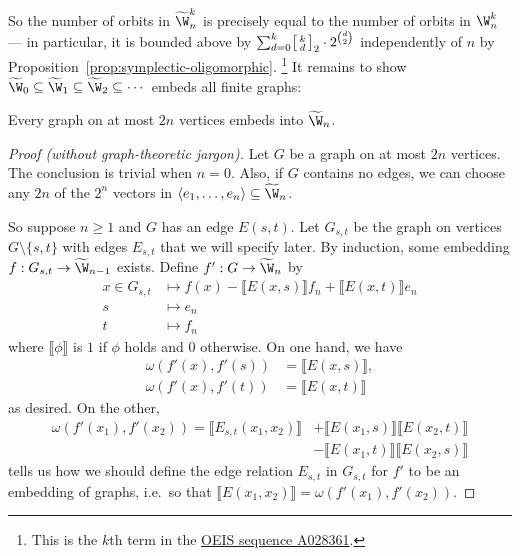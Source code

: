 So the number of orbits in $\widetilde \W_n^k$ is precisely equal to the number of orbits in $\W_n^k$
--- in particular, it is bounded above by $\sum_{d=0}^k \begin{bsmallmatrix}k \\ d\end{bsmallmatrix}_2 \cdot 2^{\binom{d}{2}}$ independently of $n$ by Proposition~\ref{prop:symplectic-oligomorphic}.%
\footnote{This is the $k$th term in the \href{https://oeis.org/A028361}{OEIS sequence A028361}.}
It remains to show $\widetilde \W_0 \subseteq \widetilde \W_1 \subseteq \widetilde \W_2 \subseteq \cdots$ embeds all finite graphs:

\begin{proposition}[{\cite[Thm.~8.11.2]{GR01}}]
    Every graph on at most $2n$ vertices embeds into $\widetilde \W_n$.
\end{proposition}
\begin{proof}[Proof (without graph-theoretic jargon)]

    Let $G$ be a graph on at most $2n$ vertices. 
    The conclusion is trivial when $n = 0$.
    Also, if $G$ contains no edges, we can choose any $2n$ of the $2^n$ vectors in 
    $\langle e_1, \ldots, e_n \rangle \subseteq \widetilde \W_n$.
    
    So suppose $n \geq 1$ and $G$ has an edge $E(s, t)$.
    Let $G_{s,t}$ be the graph on vertices $G \setminus \{s, t\}$ with edges $E_{s,t}$ that we will specify later.
    By induction, some embedding $f : G_{s, t} \to \widetilde \W_{n-1}$ exists.
    Define $f' : G \to \widetilde \W_n$ by
    \begin{align*}
        x \in G_{s, t} &\mapsto f(x) - \llbracket E(x, s) \rrbracket f_n + \llbracket E(x, t) \rrbracket e_n \\
        s &\mapsto e_n \\
        t &\mapsto f_n
    \end{align*}
    where $\llbracket \phi \rrbracket$ is $1$ if $\phi$ holds and $0$ otherwise.
    On one hand, we have
    \begin{align*}
        \omega(f'(x), f'(s)) &= \llbracket E(x, s) \rrbracket, \\
        \omega(f'(x), f'(t)) &= \llbracket E(x, t) \rrbracket
    \end{align*}
    as desired.
    On the other,
    \begin{align*}
        \omega( f'(x_1), f'(x_2) ) 
        = \llbracket E_{s,t}(x_1, x_2) \rrbracket 
        &+ \llbracket E(x_1, s) \rrbracket \llbracket E(x_2, t) \rrbracket \\
        &- \llbracket E(x_1, t) \rrbracket \llbracket E(x_2, s) \rrbracket
    \end{align*}
    tells us how we should define the edge relation $E_{s,t}$ in $G_{s,t}$ for $f'$ to be an embedding of graphs, 
    i.e.~so that $\llbracket E(x_1, x_2) \rrbracket = \omega( f'(x_1), f'(x_2) )$.
\end{proof}

